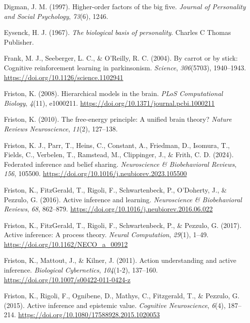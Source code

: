 \documentclass[
  jou,
  floatsintext,
  longtable,
  nolmodern,
  notxfonts,
  notimes,
  12pt,
  colorlinks=true,linkcolor=blue,citecolor=blue,urlcolor=blue]{apa7}
\newlength{\cslhangindent}
\newenvironment{CSLReferences}[2] %
 {\begin{list}{}{%
  \setlength{\itemindent}{0pt}
  \setlength{\leftmargin}{0pt}
  \setlength{\parsep}{0pt}
  \ifodd #1
   \setlength{\leftmargin}{\cslhangindent}
   \setlength{\itemindent}{-1\cslhangindent}
  \fi
  \setlength{\itemsep}{#2\baselineskip}}}
 {\end{list}}
\begin{document}
\begin{CSLReferences}{1}{0}
Digman, J. M. (1997). Higher-order factors of the big five.
\emph{Journal of Personality and Social Psychology}, \emph{73}(6), 1246.

Eysenck, H. J. (1967). \emph{The biological basis of personality}.
Charles C Thomas Publisher.

Frank, M. J., Seeberger, L. C., \& O'Reilly, R. C. (2004). By carrot or
by stick: Cognitive reinforcement learning in parkinsonism.
\emph{Science}, \emph{306}(5703), 1940--1943.
\url{https://doi.org/10.1126/science.1102941}

Friston, K. (2008). Hierarchical models in the brain. \emph{PLoS
Computational Biology}, \emph{4}(11), e1000211.
\url{https://doi.org/10.1371/journal.pcbi.1000211}

Friston, K. (2010). The free-energy principle: A unified brain theory?
\emph{Nature Reviews Neuroscience}, \emph{11}(2), 127--138.

Friston, K. J., Parr, T., Heins, C., Constant, A., Friedman, D.,
Isomura, T., Fields, C., Verbelen, T., Ramstead, M., Clippinger, J., \&
Frith, C. D. (2024). Federated inference and belief sharing.
\emph{Neuroscience \& Biobehavioral Reviews}, \emph{156}, 105500.
\url{https://doi.org/10.1016/j.neubiorev.2023.105500}

Friston, K., FitzGerald, T., Rigoli, F., Schwartenbeck, P., O'Doherty,
J., \& Pezzulo, G. (2016). Active inference and learning.
\emph{Neuroscience \& Biobehavioral Reviews}, \emph{68}, 862--879.
\url{https://doi.org/10.1016/j.neubiorev.2016.06.022}

Friston, K., FitzGerald, T., Rigoli, F., Schwartenbeck, P., \& Pezzulo,
G. (2017). Active inference: A process theory. \emph{Neural
Computation}, \emph{29}(1), 1--49.
\url{https://doi.org/10.1162/NECO_a_00912}

Friston, K., Mattout, J., \& Kilner, J. (2011). Action understanding and
active inference. \emph{Biological Cybernetics}, \emph{104}(1-2),
137--160. \url{https://doi.org/10.1007/s00422-011-0424-z}

Friston, K., Rigoli, F., Ognibene, D., Mathys, C., Fitzgerald, T., \&
Pezzulo, G. (2015). Active inference and epistemic value.
\emph{Cognitive Neuroscience}, \emph{6}(4), 187--214.
\url{https://doi.org/10.1080/17588928.2015.1020053}


\end{CSLReferences}
\end{document}
